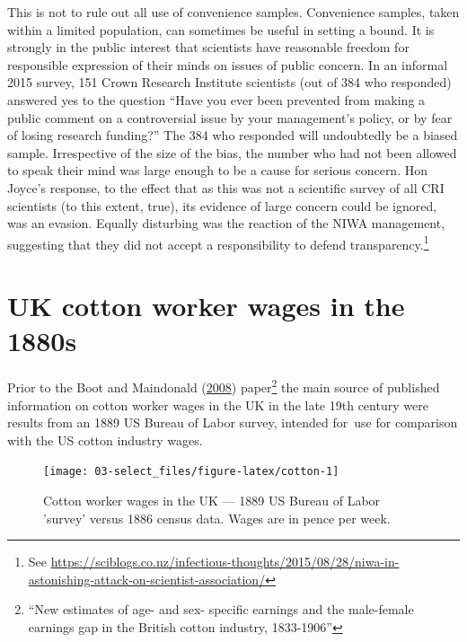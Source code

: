 \documentclass[
  10pt,
  b5paper]{book}
\begin{document}
This is not to rule out all use of convenience samples.
Convenience samples, taken within a limited population,
can sometimes be useful in setting a bound.
It is strongly in the public interest that scientists have
reasonable freedom for responsible expression of their minds
on issues of public concern. In an informal 2015 survey, 151
Crown Research Institute scientists (out of 384 who responded)
answered yes to the question ``Have you ever been prevented
from making a public comment on a controversial issue by your
management's policy, or by fear of losing research funding?''
The 384 who responded will undoubtedly be a biased sample.
Irrespective of the size of the bias, the number who had not
been allowed to speak their mind was large enough to be a cause
for serious concern. Hon Joyce's response, to the effect that
as this was not a scientific survey of all CRI scientists
(to this extent, true), its evidence of large concern could be
ignored, was an evasion. Equally disturbing was the reaction
of the NIWA management, suggesting that they did not accept a
responsibility to defend transparency.\footnote{See \url{https://sciblogs.co.nz/infectious-thoughts/2015/08/28/niwa-in-astonishing-attack-on-scientist-association/}}

\hypertarget{uk-cotton-worker-wages-in-the-1880s}{%
\section{UK cotton worker wages in the 1880s}\label{uk-cotton-worker-wages-in-the-1880s}}

Prior to the Boot and Maindonald (\protect\hyperlink{ref-boot2008new}{2008}) paper\footnote{``New estimates of age- and sex- specific
  earnings and the male-female earnings gap in the British cotton
  industry, 1833-1906''} the main source of published information on
cotton worker wages in the UK in the late 19th century were results
from an 1889 US Bureau of Labor survey, intended for~use for
comparison with the US cotton industry wages.

\begin{figure}

{\centering \texttt{[image: 03-select\_files/figure-latex/cotton-1]} 

}

\caption{Cotton worker wages in the UK --- 1889 US Bureau of Labor 'survey'
versus 1886 census data. Wages are in pence per week.}\label{fig:cotton}
\end{figure}
\end{document}
